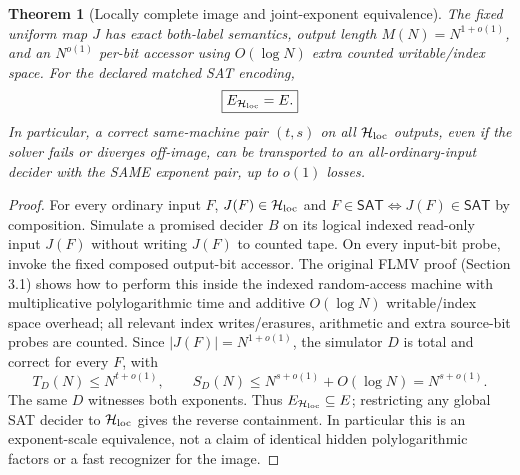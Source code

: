 \documentclass[11pt]{article}
\newtheorem{theorem}{Theorem}
\newcommand{\SAT}{\mathsf{SAT}}
\begin{document}
\begin{theorem}[Locally complete image and joint-exponent equivalence]\label{th:equiv}
The fixed uniform map $J$ has exact both-label semantics, output length $M(N)=N^{1+o(1)}$, and an $N^{o(1)}$ per-bit accessor using $O(\log N)$ extra counted writable/index space. For the declared matched SAT encoding,
\[
 \boxed{E_{\mathcal H_{\rm loc}}=E.}
\]
In particular, a correct same-machine pair $(t,s)$ on all $\mathcal H_{\rm loc}$ outputs, even if the solver fails or diverges off-image, can be transported to an all-ordinary-input decider with the SAME exponent pair, up to $o(1)$ losses.
\end{theorem}
\begin{proof}
For every ordinary input $F$, $J(F)\in\mathcal H_{\rm loc}$ and $F\in\SAT\iff J(F)\in\SAT$ by composition. Simulate a promised decider $B$ on its logical indexed read-only input $J(F)$ without writing $J(F)$ to counted tape. On every input-bit probe, invoke the fixed composed output-bit accessor. The original FLMV proof (Section 3.1) shows how to perform this inside the indexed random-access machine with multiplicative polylogarithmic time and additive $O(\log N)$ writable/index space overhead; all relevant index writes/erasures, arithmetic and extra source-bit probes are counted. Since $|J(F)|=N^{1+o(1)}$, the simulator $D$ is total and correct for every $F$, with
\[
 T_D(N)\le N^{t+o(1)},\qquad S_D(N)\le N^{s+o(1)}+O(\log N)=N^{s+o(1)}.
\]
The same $D$ witnesses both exponents. Thus $E_{\mathcal H_{\rm loc}}\subseteq E$; restricting any global SAT decider to $\mathcal H_{\rm loc}$ gives the reverse containment. In particular this is an exponent-scale equivalence, not a claim of identical hidden polylogarithmic factors or a fast recognizer for the image.\end{proof}
\end{document}

